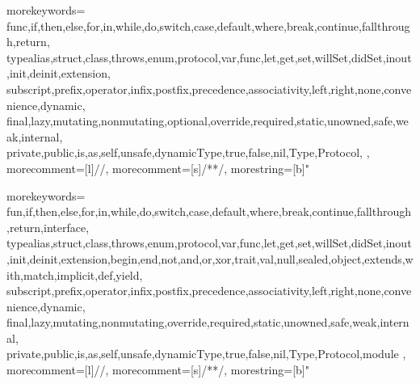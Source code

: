 \newcommand*\circled[1]{\tikz[baseline=(char.base)]{
            \node[shape=circle,draw,inner sep=0pt] (char) {#1};}}

\usepackage{tikz}

\newcommand{\smiley}{\tikz[baseline=-0.75ex,black]{
    \draw circle (2mm);
\node[fill,circle,inner sep=0.5pt] (left eye) at (135:0.8mm) {};
\node[fill,circle,inner sep=0.5pt] (right eye) at (45:0.8mm) {};
\draw (-145:0.9mm) arc (-120:-60:1.5mm);
    }
}

\newcommand{\frownie}{\tikz[baseline=-0.75ex,black]{
    \draw circle (2mm);
\node[fill,circle,inner sep=0.5pt] (left eye) at (135:0.8mm) {};
\node[fill,circle,inner sep=0.5pt] (right eye) at (45:0.8mm) {};
\draw (-145:0.9mm) arc (120:60:1.5mm);
    }
}

\newcommand{\neutranie}{\tikz[baseline=-0.75ex,black]{
    \draw circle (2mm);
\node[fill,circle,inner sep=0.5pt] (left eye) at (135:0.8mm) {};
\node[fill,circle,inner sep=0.5pt] (right eye) at (45:0.8mm) {};
\draw (-135:0.9mm) -- (-45:0.9mm);
    }
}

{
  morekeywords={
    func,if,then,else,for,in,while,do,switch,case,default,where,break,continue,fallthrough,return,
    typealias,struct,class,throws,enum,protocol,var,func,let,get,set,willSet,didSet,inout,init,deinit,extension,
    subscript,prefix,operator,infix,postfix,precedence,associativity,left,right,none,convenience,dynamic,
    final,lazy,mutating,nonmutating,optional,override,required,static,unowned,safe,weak,internal,
    private,public,is,as,self,unsafe,dynamicType,true,false,nil,Type,Protocol,
  },
  morecomment=[l]{//}, %
  morecomment=[s]{/*}{*/}, %
  morestring=[b]" %
}

{
  morekeywords={
    fun,if,then,else,for,in,while,do,switch,case,default,where,break,continue,fallthrough,return,interface,
    typealias,struct,class,throws,enum,protocol,var,func,let,get,set,willSet,didSet,inout,init,deinit,extension,begin,end,not,and,or,xor,trait,val,null,sealed,object,extends,with,match,implicit,def,yield,
    subscript,prefix,operator,infix,postfix,precedence,associativity,left,right,none,convenience,dynamic,
    final,lazy,mutating,nonmutating,override,required,static,unowned,safe,weak,internal,
    private,public,is,as,self,unsafe,dynamicType,true,false,nil,Type,Protocol,module
  },
  morecomment=[l]{//}, %
  morecomment=[s]{/*}{*/}, %
  morestring=[b]" %
}

